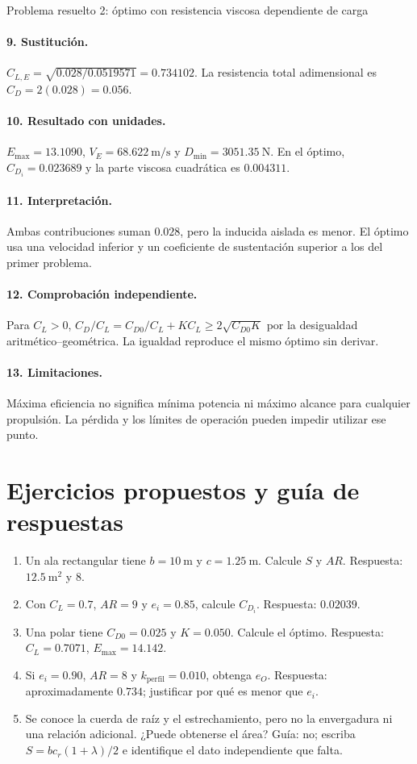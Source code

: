 \begin{studiumworked}{Problema resuelto 2: óptimo con resistencia viscosa dependiente de carga}
\paragraph{9. Sustitución.} $C_{L,E}=\sqrt{0.028/0.0519571}=0.734102$. La resistencia total adimensional es $C_D=2(0.028)=0.056$.
\paragraph{10. Resultado con unidades.} $E_{\max}=13.1090$, $V_E=68.622\ \mathrm{m/s}$ y $D_{\min}=3051.35\ \mathrm N$. En el óptimo, $C_{D_i}=0.023689$ y la parte viscosa cuadrática es $0.004311$.
\paragraph{11. Interpretación.} Ambas contribuciones suman $0.028$, pero la inducida aislada es menor. El óptimo usa una velocidad inferior y un coeficiente de sustentación superior a los del primer problema.
\paragraph{12. Comprobación independiente.} Para $C_L>0$, $C_D/C_L=C_{D0}/C_L+KC_L\geq2\sqrt{C_{D0}K}$ por la desigualdad aritmético--geométrica. La igualdad reproduce el mismo óptimo sin derivar.
\paragraph{13. Limitaciones.} Máxima eficiencia no significa mínima potencia ni máximo alcance para cualquier propulsión. La pérdida y los límites de operación pueden impedir utilizar ese punto.


\end{studiumworked}

\section{Ejercicios propuestos y guía de respuestas}
\begin{enumerate}
\item Un ala rectangular tiene $b=10\ \mathrm m$ y $c=1.25\ \mathrm m$. Calcule $S$ y $AR$. Respuesta: $12.5\ \mathrm{m^2}$ y $8$.
\item Con $C_L=0.7$, $AR=9$ y $e_i=0.85$, calcule $C_{D_i}$. Respuesta: $0.02039$.
\item Una polar tiene $C_{D0}=0.025$ y $K=0.050$. Calcule el óptimo. Respuesta: $C_L=0.7071$, $E_{\max}=14.142$.
\item Si $e_i=0.90$, $AR=8$ y $k_{\mathrm{perfil}}=0.010$, obtenga $e_O$. Respuesta: aproximadamente $0.734$; justificar por qué es menor que $e_i$.
\item Se conoce la cuerda de raíz y el estrechamiento, pero no la envergadura ni una relación adicional. ¿Puede obtenerse el área? Guía: no; escriba $S=bc_r(1+\lambda)/2$ e identifique el dato independiente que falta.
\end{enumerate}
